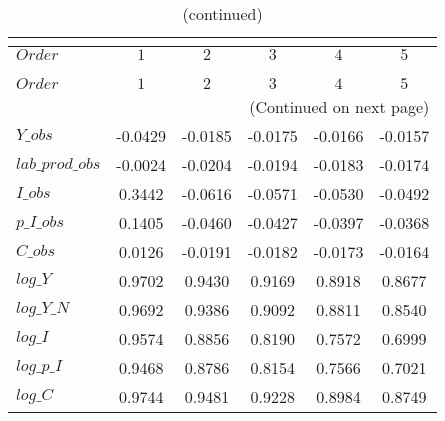  
\begin{center}
\begin{longtable}{lccccc} 
\caption{COEFFICIENTS OF AUTOCORRELATION}\\
 \label{Table:th_autocorr_matrix}\\
\toprule 
$Order           $	 & 	 $          1$	 & 	 $          2$	 & 	 $          3$	 & 	 $          4$	 & 	 $          5$\\
\midrule \endfirsthead 
\caption{(continued)}\\
 \toprule \\ 
$Order           $	 & 	 $          1$	 & 	 $          2$	 & 	 $          3$	 & 	 $          4$	 & 	 $          5$\\
\midrule \endhead 
\midrule \multicolumn{6}{r}{(Continued on next page)} \\ \bottomrule \endfoot 
\bottomrule \endlastfoot 
$Y\_obs          $	 & 	    -0.0429	 & 	    -0.0185	 & 	    -0.0175	 & 	    -0.0166	 & 	    -0.0157 \\ 
$lab\_prod\_obs  $	 & 	    -0.0024	 & 	    -0.0204	 & 	    -0.0194	 & 	    -0.0183	 & 	    -0.0174 \\ 
$I\_obs          $	 & 	     0.3442	 & 	    -0.0616	 & 	    -0.0571	 & 	    -0.0530	 & 	    -0.0492 \\ 
$p\_I\_obs       $	 & 	     0.1405	 & 	    -0.0460	 & 	    -0.0427	 & 	    -0.0397	 & 	    -0.0368 \\ 
$C\_obs          $	 & 	     0.0126	 & 	    -0.0191	 & 	    -0.0182	 & 	    -0.0173	 & 	    -0.0164 \\ 
$log\_Y          $	 & 	     0.9702	 & 	     0.9430	 & 	     0.9169	 & 	     0.8918	 & 	     0.8677 \\ 
$log\_Y\_N       $	 & 	     0.9692	 & 	     0.9386	 & 	     0.9092	 & 	     0.8811	 & 	     0.8540 \\ 
$log\_I          $	 & 	     0.9574	 & 	     0.8856	 & 	     0.8190	 & 	     0.7572	 & 	     0.6999 \\ 
$log\_p\_I       $	 & 	     0.9468	 & 	     0.8786	 & 	     0.8154	 & 	     0.7566	 & 	     0.7021 \\ 
$log\_C          $	 & 	     0.9744	 & 	     0.9481	 & 	     0.9228	 & 	     0.8984	 & 	     0.8749 \\ 
\end{longtable}
 \end{center}
